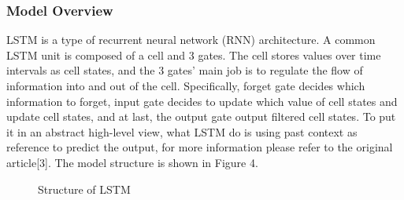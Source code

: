 \documentclass{article}
\begin{document}
\subsubsection{Model Overview}
LSTM is a type of recurrent neural network (RNN) architecture. A common LSTM unit is composed of a cell and 3 gates. The cell stores values over time intervals as cell states, and the 3 gates’ main job is to regulate the flow of information into and out of the cell. Specifically, forget gate decides which information to forget, input gate decides to update which value of cell states and update cell states, and at last, the output gate output filtered cell states. To put it in an abstract high-level view, what LSTM do is using past context as reference to predict the output, for more information please refer to the original article[3]. The model structure is shown in Figure 4.
 \begin{figure}
  \centering
  \caption{Structure of LSTM}
\end{figure}
\end{document}
